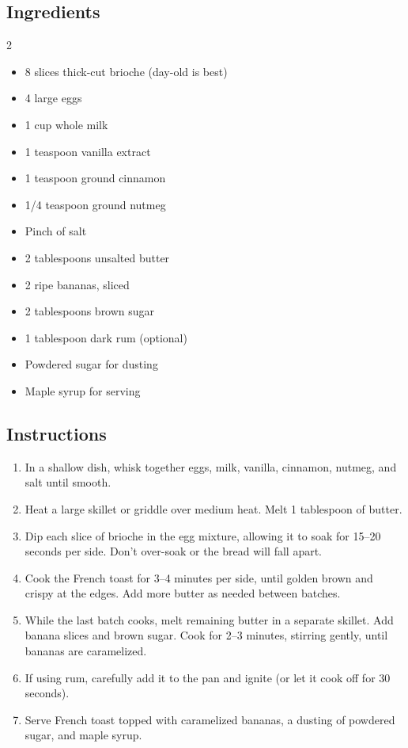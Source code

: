 \documentclass[
    language=english,
    doctype=recipe-book,
    institution=none,
]{../../omnilatex}
\begin{document}
\subsection*{Ingredients}

\begin{multicols}{2}
\begin{itemize}[leftmargin=*]
    \item 8 slices thick-cut brioche (day-old is best)
    \item 4 large eggs
    \item 1 cup whole milk
    \item 1 teaspoon vanilla extract
    \item 1 teaspoon ground cinnamon
    \item 1/4 teaspoon ground nutmeg
    \item Pinch of salt
    \item 2 tablespoons unsalted butter
    \item 2 ripe bananas, sliced
    \item 2 tablespoons brown sugar
    \item 1 tablespoon dark rum (optional)
    \item Powdered sugar for dusting
    \item Maple syrup for serving
\end{itemize}
\end{multicols}

\subsection*{Instructions}

\begin{enumerate}
    \item In a shallow dish, whisk together eggs, milk, vanilla, cinnamon, nutmeg, and salt until smooth.
    \item Heat a large skillet or griddle over medium heat. Melt 1 tablespoon of butter.
    \item Dip each slice of brioche in the egg mixture, allowing it to soak for 15--20 seconds per side. Don't over-soak or the bread will fall apart.
    \item Cook the French toast for 3--4 minutes per side, until golden brown and crispy at the edges. Add more butter as needed between batches.
    \item While the last batch cooks, melt remaining butter in a separate skillet. Add banana slices and brown sugar. Cook for 2--3 minutes, stirring gently, until bananas are caramelized.
    \item If using rum, carefully add it to the pan and ignite (or let it cook off for 30 seconds).
    \item Serve French toast topped with caramelized bananas, a dusting of powdered sugar, and maple syrup.
\end{enumerate}
\end{document}
